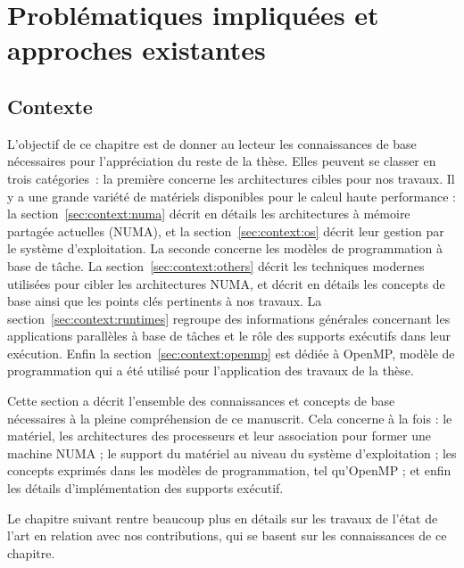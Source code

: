 \part{Problématiques impliquées et approches existantes}

\chapter{Contexte}\label{chap:contexte}
\chaptertoc
\vfill

\pagebreak

L'objectif de ce chapitre est de donner au lecteur les connaissances de base nécessaires pour l'appréciation du reste de la thèse.
Elles peuvent se classer en trois catégories~: la première concerne les architectures cibles pour nos travaux. Il y a une grande variété de matériels disponibles pour le calcul haute performance : la section~\ref{sec:context:numa} décrit en détails les architectures à mémoire partagée actuelles (NUMA), et la section~\ref{sec:context:os} décrit leur gestion par le système d'exploitation.
La seconde concerne les modèles de programmation à base de tâche. La section~\ref{sec:context:others} décrit les techniques modernes utilisées pour cibler les architectures NUMA, et décrit en détails les concepts de base ainsi que les points clés pertinents à nos travaux.
La section~\ref{sec:context:runtimes} regroupe des informations générales concernant les applications parallèles à base de tâches et le rôle des supports exécutifs dans leur exécution.
Enfin la section~\ref{sec:context:openmp} est dédiée à OpenMP, modèle de programmation qui a été utilisé pour l'application des travaux de la thèse.







\bigskip

Cette section a décrit l'ensemble des connaissances et concepts de base nécessaires à la pleine compréhension de ce manuscrit.
Cela concerne à la fois : le matériel, les architectures des processeurs et leur association pour former une machine NUMA ; le support du matériel au niveau du système d'exploitation ; les concepts exprimés dans les modèles de programmation, tel qu'OpenMP ; et enfin les détails d'implémentation des supports exécutif.

Le chapitre suivant rentre beaucoup plus en détails sur les travaux de l'état de l'art en relation avec nos contributions, qui se basent sur les connaissances de ce chapitre.

